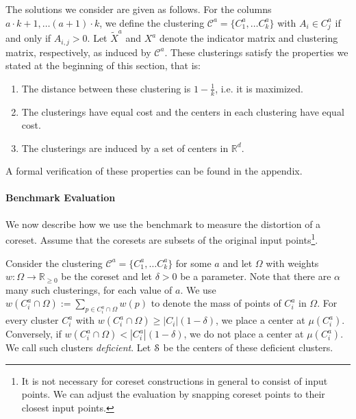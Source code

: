 The solutions we consider are given as follows. For the columns $a\cdot k+1,\ldots (a+1)\cdot k$, we define the clustering $\mathcal{C}^{a} = \{C_1^a,\ldots C_k^a\}$ with 
$A_i\in C_j^a$ if and only if $A_{i,j} > 0$. Let $\tilde X^a$ and $X^{a}$ denote the indicator matrix and clustering matrix, respectively, as induced by $\mathcal{C}^{a}$.
These clusterings satisfy the properties we stated at the beginning of this section, that is:
\begin{enumerate}
\item The distance between these clustering is $1-\frac{1}{k}$, i.e. it is maximized.
\item The clusterings have equal cost and the centers in each clustering have equal cost.
\item The clusterings are induced by a set of centers in $\mathbb{R}^d$.
\end{enumerate}
A formal verification of these properties can be found in the appendix.




\paragraph*{Benchmark Evaluation}

We now describe how we use the benchmark to measure the distortion of a coreset. Assume that the coresets are subsets of the original input points\footnote{It is not necessary for coreset constructions in general to consist of input points. We can adjust the evaluation by snapping coreset points to their closest input points.
}.

Consider the clustering $\mathcal{C}^{a} = \{C_1^a,\ldots C_k^a\}$ for some $a$ and let $\Omega$ with weights $w:\Omega\rightarrow \mathbb{R}_{\geq 0}$ be the coreset and let $\delta>0$ be a parameter. 
Note that there are $\alpha$ many such clusterings, for each value of $a$.
We use $w(C_i^a \cap \Omega):=\sum_{p\in C_i^a \cap \Omega} w(p)$ to denote the mass of points of $C_i^a$ in $\Omega$.
For every cluster $C_i^a$ with $w(C_i^a \cap \Omega)\geq |C_i| (1-\delta)$, we place a center at $\mu(C_i^a)$. Conversely, if $w(C_i^a \cap \Omega)< |C_i^a| (1-\delta)$, we do not place a center at $\mu(C_i^a)$. We call such clusters \emph{deficient}. Let $\mathcal{S}$ be the centers of these deficient clusters.

